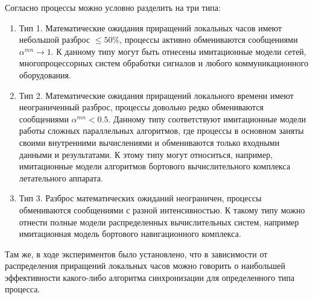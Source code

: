 Согласно \cite{voz-disser} процессы можно условно разделить на три типа: 
\begin{enumerate}
  \item Тип 1. Математические ожидания приращений локальных часов имеют небольшой разброс $\leqslant 50\%$, процессы активно обмениваются сообщениями $\alpha^{mn}\rightarrow 1$. К данному типу могут быть отнесены имитационные модели сетей, многопроцессорных систем обработки сигналов и любого коммуникационного оборудования.
  \item Тип 2. Математические ожидания приращений локального времени имеют неограниченный разброс, процессы довольно редко обмениваются сообщениями $\alpha^{mn}<0.5$. Данному типу соответствуют имитационные модели работы сложных параллельных алгоритмов, где процессы в основном заняты своими внутренними вычислениями и обмениваются только входными данными и результатами. К этому типу могут относиться, например, имитационные модели алгоритмов бортового вычислительного комплекса летательного аппарата.
  \item Тип 3. Разброс математических ожиданий неограничен, процессы обмениваются сообщениями с разной интенсивностью. К такому типу можно отнести полные модели распределенных вычислительных систем, например имитационная модель бортового навигационного комплекса.
\end{enumerate}

Там же, в ходе экспериментов было установлено, что в зависимости от распределения приращений локальных часов можно говорить о наибольшей эффективности какого-либо алгоритма синхронизации для определенного типа процесса.

